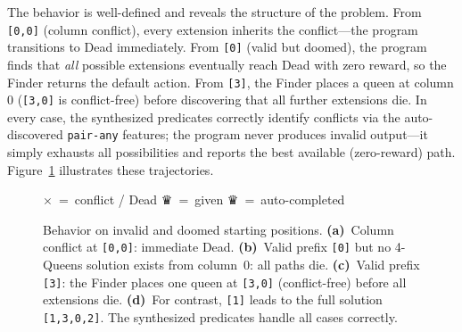 \noindent The behavior is well-defined and reveals the structure of the problem.  From \texttt{[0,0]} (column conflict), every extension inherits the conflict---the program transitions to Dead immediately.  From \texttt{[0]} (valid but doomed), the program finds that \emph{all} possible extensions eventually reach Dead with zero reward, so the Finder returns the default action.  From \texttt{[3]}, the Finder places a queen at column 0 (\texttt{[3,0]} is conflict-free) before discovering that all further extensions die.  In every case, the synthesized predicates correctly identify conflicts via the auto-discovered \texttt{pair-any} features; the program never produces invalid output---it simply exhausts all possibilities and reports the best available (zero-reward) path.  Figure~\ref{fig:queens-doomed} illustrates these trajectories.

\begin{figure}[t]
\centering
%
%
\hspace{0.6cm}%
%
\hspace{0.6cm}%
%
\hspace{0.6cm}%
%

\medskip
{\footnotesize \textcolor{nord11}{\bfseries$\times$}~=~conflict / Dead \qquad \textcolor{nord0}{\LARGE\sffamily ♛}~=~given \qquad \textcolor{nord10}{\LARGE\sffamily ♛}~=~auto-completed}
\caption{Behavior on invalid and doomed starting positions. \textbf{(a)}~Column conflict at \texttt{[0,0]}: immediate Dead.  \textbf{(b)}~Valid prefix \texttt{[0]} but no 4-Queens solution exists from column~0: all paths die.  \textbf{(c)}~Valid prefix \texttt{[3]}: the Finder places one queen at \texttt{[3,0]} (conflict-free) before all extensions die.  \textbf{(d)}~For contrast, \texttt{[1]} leads to the full solution \texttt{[1,3,0,2]}.  The synthesized predicates handle all cases correctly.}
\label{fig:queens-doomed}
\end{figure}

